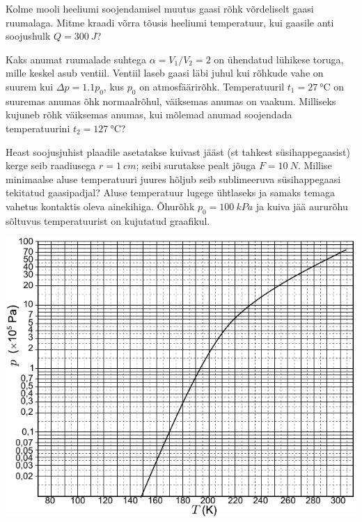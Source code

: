 \documentclass[10pt]{article}
\begin{document}
{
Kolme mooli heeliumi soojendamisel muutus gaasi rõhk võrdeliselt gaasi ruumalaga. Mitme kraadi võrra tõusis heeliumi temperatuur, kui gaasile anti soojushulk $Q = \SI{300}{J}$?
\probend
\bigskip


Kaks anumat ruumalade suhtega $\alpha = V_1/V_2 = 2$ on ühendatud lühikese toruga, mille keskel asub ventiil. Ventiil laseb gaasi läbi juhul kui rõhkude vahe on suurem kui $\Delta p = \num{1,1}p_0$, kus $p_0$ on atmosfäärirõhk. Temperatuuril $t_1 = \SI{27}{\degreeCelsius}$ on suuremas anumas õhk normaalrõhul, väiksemas anumas on vaakum. Milliseks kujuneb rõhk väiksemas anumas, kui mõlemad anumad soojendada temperatuurini $t_2 = \SI{127}{\degreeCelsius}$?
\probend
\bigskip


Heast soojusjuhist plaadile asetatakse kuivast jääst (st tahkest
süsihappegaasist) kerge seib raadiusega $r=\SI{1}{cm}$; seibi surutakse
pealt jõuga $F=\SI{10}{N}$. Millise minimaalse aluse
temperatuuri juures hõljub seib sublimeeruva süsihappegaasi tekitatud
gaasipadjal? Aluse temperatuur lugege ühtlaseks ja samaks temaga
vahetus kontaktis oleva ainekihiga. Õhurõhk $p_{0}=\SI{100}{kPa}$
ja kuiva jää aururõhu sõltuvus temperatuurist on kujutatud graafikul.

\begin{center}
	\includegraphics{2010-v3g-06-Aururohk}
\end{center}
\probend
\bigskip

}
\end{document}

